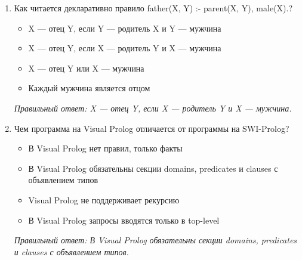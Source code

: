 \begin{enumerate}[label=\textbf{\arabic*.}, leftmargin=0pt, itemsep=1.2em]
\item Как читается декларативно правило father(X, Y) :- parent(X, Y), male(X).?
\begin{itemize}[label=$\square$, leftmargin=1.5cm, itemsep=0.2em, topsep=0.3em]
\item X — отец Y, если Y — родитель X и Y — мужчина
\item X — отец Y, если X — родитель Y и X — мужчина
\item X — отец Y или X — мужчина
\item Каждый мужчина является отцом
\end{itemize}
{\small\textit{Правильный ответ: X — отец Y, если X — родитель Y и X — мужчина.}}

\item Чем программа на Visual Prolog отличается от программы на SWI-Prolog?
\begin{itemize}[label=$\square$, leftmargin=1.5cm, itemsep=0.2em, topsep=0.3em]
\item В Visual Prolog нет правил, только факты
\item В Visual Prolog обязательны секции domains, predicates и clauses с объявлением типов
\item Visual Prolog не поддерживает рекурсию
\item В Visual Prolog запросы вводятся только в top-level
\end{itemize}
{\small\textit{Правильный ответ: В Visual Prolog обязательны секции domains, predicates и clauses с объявлением типов.}}
\end{enumerate}
\normalsize
